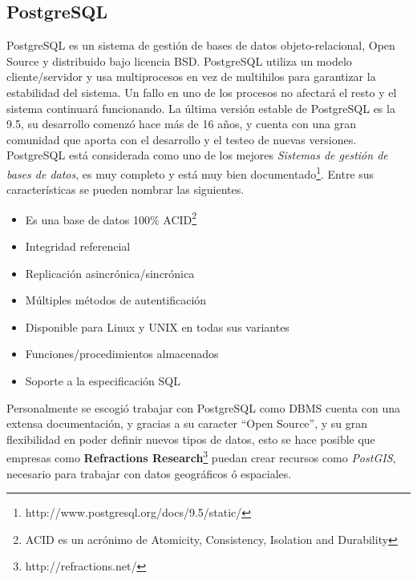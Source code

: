    \subsection{PostgreSQL} %
    \label{sec:postgres}

      PostgreSQL es un sistema de gestión de bases de datos objeto-relacional, Open Source y distribuido bajo licencia BSD.
      PostgreSQL utiliza un modelo cliente/servidor y usa multiprocesos en vez de multihilos para garantizar la estabilidad del sistema. Un fallo en uno de los procesos no afectará el resto y el sistema continuará funcionando.
      La última versi\'on estable de PostgreSQL es la 9.5, su desarrollo comenz\'o hace más de 16 años, y cuenta con una gran comunidad que aporta con el desarrollo y el testeo de nuevas versiones.
      PostgreSQL  está considerada como uno de los mejores \emph{Sistemas de gesti\'on de bases de datos}, es muy completo y está muy bien documentado\footnote{ http://www.postgresql.org/docs/9.5/static/}.
      Entre sus características se pueden nombrar las siguientes.
      \begin{itemize}
        \item Es una base de datos 100\% ACID\footnote{  ACID es un acrónimo de Atomicity, Consistency, Isolation and Durability}
        \item Integridad referencial
        \item Replicación asincrónica/sincrónica
        \item Múltiples métodos de autentificación
        \item Disponible para Linux y UNIX en todas sus variantes
        \item Funciones/procedimientos almacenados
        \item Soporte a la especificaci\'on SQL
      \end{itemize}

      Personalmente se escogió trabajar con  PostgreSQL como DBMS cuenta con una extensa documentación,  y gracias a su caracter ``Open Source'', y su gran flexibilidad en poder definir nuevos tipos de datos, esto se hace posible que empresas como \textbf{Refractions Research}\footnote{http://refractions.net/} puedan crear recursos como \emph{PostGIS}, necesario para trabajar con datos geográficos \'o espaciales.


